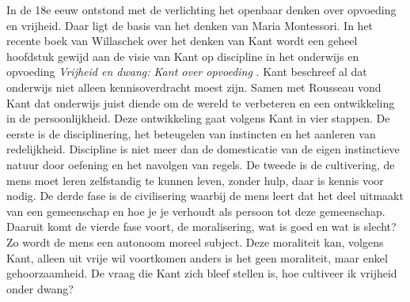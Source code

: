 \documentclass[12pt, a4paper]{article}
\begin{document}
In de 18e eeuw ontstond met de verlichting het openbaar denken over opvoeding en vrijheid. Daar ligt de basis van het denken van Maria Montessori. In het recente boek van Willaschek over het denken van Kant wordt een geheel hoofdstuk gewijd aan de visie van Kant op discipline in het onderwijs en opvoeding \emph{Vrijheid en dwang: Kant over opvoeding} \cite[p. 67-78]{willaschek}. Kant beschreef al dat onderwijs niet alleen kennisoverdracht moest zijn. Samen met Rousseau vond Kant dat onderwijs juist diende om de wereld te verbeteren en een ontwikkeling in de persoonlijkheid. Deze ontwikkeling gaat volgens Kant in vier stappen. De eerste is de disciplinering, het beteugelen van instincten en het aanleren van redelijkheid. Discipline is niet meer dan de domesticatie van de eigen instinctieve natuur door oefening en het navolgen van regels. De tweede is de cultivering, de mens moet leren zelfstandig te kunnen leven, zonder hulp, daar is kennis voor nodig. De derde fase is de civilisering waarbij de mens leert dat het deel uitmaakt van een gemeenschap en hoe je je verhoudt als persoon tot deze gemeenschap. Daaruit komt de vierde fase voort, de moralisering, wat is goed en wat is slecht? Zo wordt de mens een autonoom moreel subject. Deze moraliteit kan, volgens Kant, alleen uit vrije wil voortkomen anders is het geen moraliteit, maar enkel gehoorzaamheid. De vraag die Kant zich bleef stellen is, hoe cultiveer ik vrijheid onder dwang? \cite[p. 70-71]{willaschek} 
\end{document}
